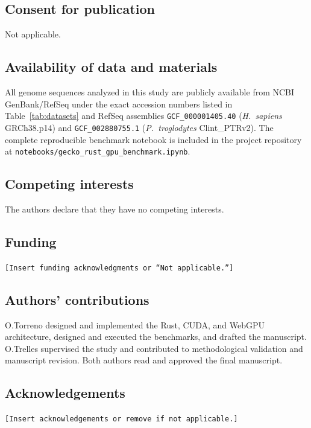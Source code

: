 \documentclass[pdflatex,sn-vancouver,Numbered]{sn-jnl}
\newcommand{\tbd}[1]{\textcolor{orange!75!black}{\texttt{[#1]}}}
\begin{document}
\subsection*{Consent for publication}
Not applicable.

\subsection*{Availability of data and materials}
All genome sequences analyzed in this study are publicly available from NCBI GenBank/RefSeq under the exact accession numbers listed in Table~\ref{tab:datasets} and RefSeq assemblies \texttt{GCF\_000001405.40} (\textit{H.~sapiens} GRCh38.p14) and \texttt{GCF\_002880755.1} (\textit{P.~troglodytes} Clint\_PTRv2). The complete reproducible benchmark notebook is included in the project repository at \texttt{notebooks/gecko\_rust\_gpu\_benchmark.ipynb}.

\subsection*{Competing interests}
The authors declare that they have no competing interests.

\subsection*{Funding}
\tbd{Insert funding acknowledgments or ``Not applicable.''}

\subsection*{Authors' contributions}
O.Torreno designed and implemented the Rust, CUDA, and WebGPU architecture, designed and executed the benchmarks, and drafted the manuscript. O.Trelles supervised the study and contributed to methodological validation and manuscript revision. Both authors read and approved the final manuscript.

\subsection*{Acknowledgements}
\tbd{Insert acknowledgements or remove if not applicable.}


\end{document}
